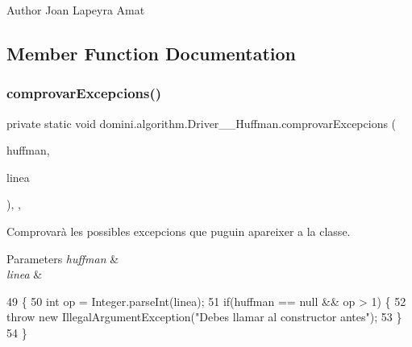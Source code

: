 \begin{DoxyAuthor}{Author}
Joan Lapeyra Amat 
\end{DoxyAuthor}


\subsection{Member Function Documentation}
\mbox{\label{classdomini_1_1algorithm_1_1Driver____Huffman_a5d56f18f1d8f96dfc735b9a127094319}} 
\subsubsection{\texorpdfstring{comprovar\+Excepcions()}{comprovarExcepcions()}}
{\footnotesize\ttfamily private static void domini.\+algorithm.\+Driver\+\_\+\+\_\+\+Huffman.\+comprovar\+Excepcions (\begin{DoxyParamCaption}\item[{\hyperlink{classHuffman}{Huffman}}]{huffman,  }\item[{String}]{linea }\end{DoxyParamCaption})\hspace{0.3cm}{\ttfamily [inline]}, {\ttfamily [static]}, {\ttfamily [private]}}



Comprovarà les possibles excepcions que puguin apareixer a la classe. 


\begin{DoxyParams}{Parameters}
{\em huffman} & \\
\hline
{\em linea} & \\
\hline
\end{DoxyParams}

\begin{DoxyCode}
49                                                                           \{
50         \textcolor{keywordtype}{int} op = Integer.parseInt(linea);
51         \textcolor{keywordflow}{if}(huffman == null && op > 1) \{
52             \textcolor{keywordflow}{throw} \textcolor{keyword}{new} IllegalArgumentException(\textcolor{stringliteral}{"Debes llamar al constructor antes"});
53         \}
54     \}
\end{DoxyCode}
\mbox{\label{classdomini_1_1algorithm_1_1Driver____Huffman_a2fe727dd4ebafefce42bdc94f5dd80fe}} 
